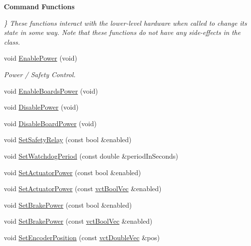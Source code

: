 \begin{Indent}{\bf Command Functions}\par
{\em \} These functions interact with the lower-\/level hardware when called to change its state in some way. Note that these functions do not have any side-\/effects in the class. }\begin{DoxyCompactItemize}
\item 
void \hyperlink{classsaw_robot_i_o1394_1_1osa_robot1394_a89f0d7f2ed2aa3d5e8398da89276b108}{Enable\+Power} (void)
\begin{DoxyCompactList}\small\item\em Power / Safety Control. \end{DoxyCompactList}\item 
void \hyperlink{classsaw_robot_i_o1394_1_1osa_robot1394_ac31ce6b6da5276bae89eebce4e9a186b}{Enable\+Boards\+Power} (void)
\item 
void \hyperlink{classsaw_robot_i_o1394_1_1osa_robot1394_a359d28a205ddf92f7b51140ac3fbbf30}{Disable\+Power} (void)
\item 
void \hyperlink{classsaw_robot_i_o1394_1_1osa_robot1394_ac3166a4f77a336b7d62bd3a4714b6f19}{Disable\+Board\+Power} (void)
\item 
void \hyperlink{classsaw_robot_i_o1394_1_1osa_robot1394_affb84d6b12bd5f71e88ce7aaefe3023f}{Set\+Safety\+Relay} (const bool \&enabled)
\item 
void \hyperlink{classsaw_robot_i_o1394_1_1osa_robot1394_a6635e06d2704dd3b19c8527de6a00f29}{Set\+Watchdog\+Period} (const double \&period\+In\+Seconds)
\item 
void \hyperlink{classsaw_robot_i_o1394_1_1osa_robot1394_ac663115c6f8371a09a58829815b3bcfc}{Set\+Actuator\+Power} (const bool \&enabled)
\item 
void \hyperlink{classsaw_robot_i_o1394_1_1osa_robot1394_a9c4d9418f9f94029a424793754aec522}{Set\+Actuator\+Power} (const \hyperlink{vct_dynamic_vector_types_8h_aeb2237c134aee3769198bd9d55c8a9e0}{vct\+Bool\+Vec} \&enabled)
\item 
void \hyperlink{classsaw_robot_i_o1394_1_1osa_robot1394_aba8de9371f9f46984f92970a30c2fd8e}{Set\+Brake\+Power} (const bool \&enabled)
\item 
void \hyperlink{classsaw_robot_i_o1394_1_1osa_robot1394_a7b6d3652c1b1933d64d3ffd6cf143db2}{Set\+Brake\+Power} (const \hyperlink{vct_dynamic_vector_types_8h_aeb2237c134aee3769198bd9d55c8a9e0}{vct\+Bool\+Vec} \&enabled)
\item 
void \hyperlink{classsaw_robot_i_o1394_1_1osa_robot1394_a85fab2fddef54480e415cf09ec9cb2ff}{Set\+Encoder\+Position} (const \hyperlink{vct_dynamic_vector_types_8h_ade4b3068c86fb88f41af2e5187e491c2}{vct\+Double\+Vec} \&pos)

\end{DoxyCompactItemize}
\end{Indent}
